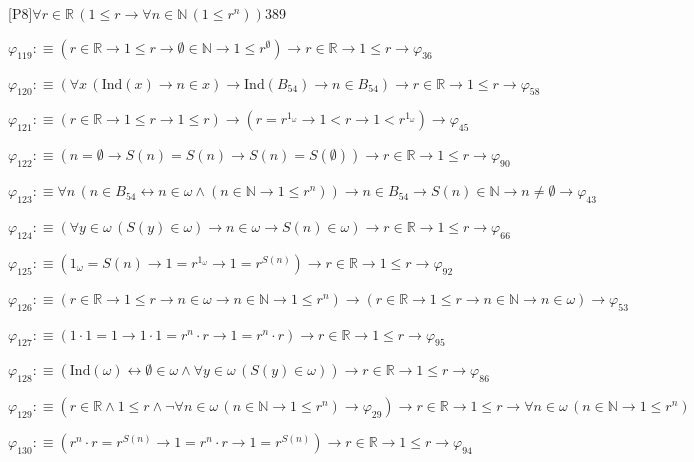 \begin{fullproof}{[P8]}{$\forall r \in \mathbb{R}\,(1 \leq r \to \forall n \in \mathbb{N}\,(1 \leq {{r}^{n}}))$}{389}
\begin{abbrevlist}
\item $\varphi_{119} :\equiv (r \in \mathbb{R} \to 1 \leq r \to \emptyset \in \mathbb{N} \to 1 \leq {{r}^{\emptyset}}) \to r \in \mathbb{R} \to 1 \leq r \to \varphi_{36}$
\item $\varphi_{120} :\equiv (\forall x\,(\mathrm{Ind}(x) \to n \in x) \to \mathrm{Ind}(B_{54}) \to n \in B_{54}) \to r \in \mathbb{R} \to 1 \leq r \to \varphi_{58}$
\item $\varphi_{121} :\equiv (r \in \mathbb{R} \to 1 \leq r \to 1 \leq r) \to (r = {{r}^{1_{\omega}}} \to 1 < r \to 1 < {{r}^{1_{\omega}}}) \to \varphi_{45}$
\item $\varphi_{122} :\equiv (n = \emptyset \to S(n) = S(n) \to S(n) = S(\emptyset)) \to r \in \mathbb{R} \to 1 \leq r \to \varphi_{90}$
\item $\varphi_{123} :\equiv \forall n\,(n \in B_{54} \leftrightarrow n \in \omega \land (n \in \mathbb{N} \to 1 \leq {{r}^{n}})) \to n \in B_{54} \to S(n) \in \mathbb{N} \to n \neq \emptyset \to \varphi_{43}$
\item $\varphi_{124} :\equiv (\forall y \in \omega\,(S(y) \in \omega) \to n \in \omega \to S(n) \in \omega) \to r \in \mathbb{R} \to 1 \leq r \to \varphi_{66}$
\item $\varphi_{125} :\equiv (1_{\omega} = S(n) \to 1 = {{r}^{1_{\omega}}} \to 1 = {{r}^{S(n)}}) \to r \in \mathbb{R} \to 1 \leq r \to \varphi_{92}$
\item $\varphi_{126} :\equiv (r \in \mathbb{R} \to 1 \leq r \to n \in \omega \to n \in \mathbb{N} \to 1 \leq {{r}^{n}}) \to (r \in \mathbb{R} \to 1 \leq r \to n \in \mathbb{N} \to n \in \omega) \to \varphi_{53}$
\item $\varphi_{127} :\equiv (1 \cdot 1 = 1 \to 1 \cdot 1 = {{r}^{n}} \cdot r \to 1 = {{r}^{n}} \cdot r) \to r \in \mathbb{R} \to 1 \leq r \to \varphi_{95}$
\item $\varphi_{128} :\equiv (\mathrm{Ind}(\omega) \leftrightarrow \emptyset \in \omega \land \forall y \in \omega\,(S(y) \in \omega)) \to r \in \mathbb{R} \to 1 \leq r \to \varphi_{86}$
\item $\varphi_{129} :\equiv (r \in \mathbb{R} \land 1 \leq r \land \neg \forall n \in \omega\,(n \in \mathbb{N} \to 1 \leq {{r}^{n}}) \to \varphi_{29}) \to r \in \mathbb{R} \to 1 \leq r \to \forall n \in \omega\,(n \in \mathbb{N} \to 1 \leq {{r}^{n}})$
\item $\varphi_{130} :\equiv ({{r}^{n}} \cdot r = {{r}^{S(n)}} \to 1 = {{r}^{n}} \cdot r \to 1 = {{r}^{S(n)}}) \to r \in \mathbb{R} \to 1 \leq r \to \varphi_{94}$

\end{abbrevlist}
\end{fullproof}
